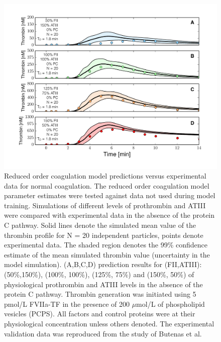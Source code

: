 \documentclass[12pt]{article}
\begin{document}
\begin{figure}
\centering
\includegraphics[width=1.0\textwidth]{./figs/Figure-5-FII_ATIII.pdf}
\caption{Reduced order coagulation model predictions versus experimental data for normal coagulation. 
The reduced order coagulation model parameter estimates were tested against data not used during model training.
Simulations of different levels of prothrombin and ATIII were compared with experimental data in the absence of the protein C pathway. 
Solid lines denote the simulated mean value of the thrombin profile for N = 20 independent particles, points denote experimental data.
The shaded region denotes the 99\% confidence estimate of the mean simulated thrombin value (uncertainty in the model simulation). 
(A,B,C,D) prediction results for (FII,ATIII): (50\%,150\%), (100\%, 100\%), (125\%, 75\%) and (150\%, 50\%) of physiological prothrombin and ATIII levels in the absence of the protein C pathway. 
Thrombin generation was initiated using 5 pmol/L FVIIa-TF in the presence of 200 $\mu$mol/L of phospholipid vesicles (PCPS). 
All factors and control proteins were at their physiological concentration unless others denoted.
The experimental validation data was reproduced from the study of Butenas et al. \citep{Butenas:1999aa}}\label{fig-fII_ATIII}
\end{figure}

\clearpage
\end{document}
